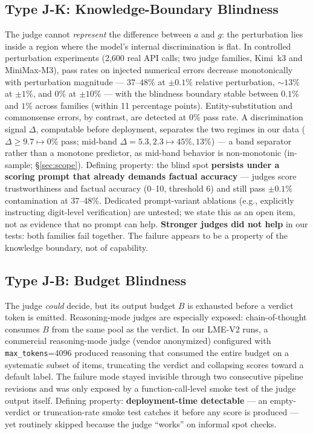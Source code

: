 \documentclass[11pt]{article}
\begin{document}
\subsection{Type J-K: Knowledge-Boundary Blindness}
\label{sec:jk}

The judge cannot \emph{represent} the difference between $a$ and $g$: the perturbation
lies inside a region where the model's internal discrimination is flat.
In controlled perturbation experiments (2{,}600 real API calls; two judge families,
Kimi~k3 and MiniMax-M3), pass rates on injected numerical errors decrease
monotonically with perturbation magnitude --- 37--48\% at $\pm 0.1\%$ relative
perturbation, ${\sim}13\%$ at $\pm 1\%$, and $0\%$ at $\pm 10\%$ --- with the blindness
boundary stable between $0.1\%$ and $1\%$ across families (within 11 percentage
points). Entity-substitution and commonsense errors, by contrast, are detected at
0\% pass rate. A discrimination signal $\Delta$, computable before deployment,
separates the two regimes in our data ($\Delta \geq 9.7 \mapsto 0\%$ pass; mid-band
$\Delta = 5.3, 2.3 \mapsto 45\%, 13\%$) --- a band separator rather than a
monotone predictor, as mid-band behavior is non-monotonic (in-sample; \S\ref{sec:scope}).
Defining property: the blind spot \textbf{persists under a scoring prompt that
already demands factual accuracy} --- judges score trustworthiness and factual
accuracy (0--10, threshold 6) and still pass $\pm 0.1\%$ contamination at
37--48\%. Dedicated prompt-variant ablations (e.g., explicitly instructing
digit-level verification) are untested; we state this as an open item, not
as evidence that no prompt can help. \textbf{Stronger judges did not help}
in our tests: both families fail together. The failure appears to be a
property of the knowledge boundary, not of capability.

\subsection{Type J-B: Budget Blindness}
\label{sec:jb}

The judge \emph{could} decide, but its output budget $B$ is exhausted before a
verdict token is emitted. Reasoning-mode judges are especially exposed: chain-of-thought
consumes $B$ from the same pool as the verdict. In our LME-V2 runs, a commercial
reasoning-mode judge (vendor anonymized)
configured with \texttt{max\_tokens}=4096 produced reasoning that consumed the entire
budget on a systematic subset of items, truncating the verdict and collapsing scores
toward a default label. The failure mode stayed invisible through two consecutive
pipeline revisions and was only exposed by a function-call-level smoke test of the
judge output itself. Defining property: \textbf{deployment-time detectable} --- an
empty-verdict or truncation-rate smoke test catches it before any score is produced
--- yet routinely skipped because the judge ``works'' on informal spot checks.
\end{document}
